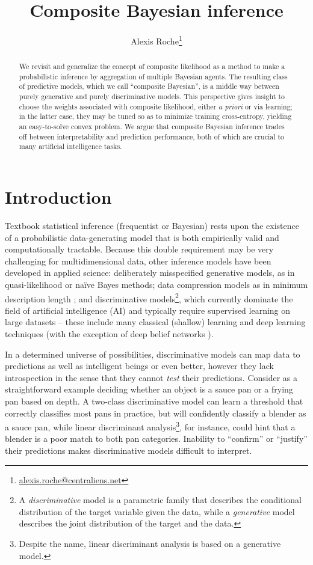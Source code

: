 \documentclass[english]{scrartcl}
\title{Composite Bayesian inference}
\author{Alexis Roche\thanks{\url{alexis.roche@centraliens.net}}}
\begin{document}
\maketitle

\begin{abstract}
We revisit and generalize the concept of composite likelihood as a method to make a probabilistic inference by aggregation of multiple Bayesian agents. The resulting class of predictive models, which we call ``composite Bayesian'', is a middle way between purely generative and purely discriminative models. This perspective gives insight to choose the weights associated with composite likelihood, either {\em a priori} or via learning; in the latter case, they may be tuned so as to minimize training cross-entropy, yielding an easy-to-solve convex problem. We argue that composite Bayesian inference trades off between interpretability and prediction performance, both of which are crucial to many artificial intelligence tasks.
\end{abstract}


\section{Introduction}
\label{sec:intro}

Textbook statistical inference (frequentist or Bayesian) rests upon the existence of a probabilistic data-generating model that is both empirically valid and computationally tractable. Because this double requirement may be very challenging for multidimensional data, other inference models have been developed in applied science: deliberately misspecified generative models, as in quasi-likelihood \cite{White-82,Walker-13} or na\"ive Bayes \cite{Ng-01} methods; data compression models as in minimum description length \cite{Grunwald-07}; and discriminative models\footnote{A {\em discriminative} model is a parametric family that describes the conditional distribution of the target variable given the data, while a {\em generative} model describes the joint distribution of the target and the data.}, which currently dominate the field of artificial intelligence (AI) and typically require supervised learning on large datasets -- these include many classical (shallow) learning \cite{Ho-95,BergerA-96,Vapnik-00,Rasmussen-06} and deep learning \cite{Lecun-15,Goodfellow-16} techniques (with the exception of deep belief networks \cite{Hinton-06}).

In a determined universe of possibilities, discriminative models can map data to predictions as well as intelligent beings or even better, however they lack introspection in the sense that they cannot {\em test} their predictions. Consider as a straightforward example deciding whether an object is a sauce pan or a frying pan based on depth. A two-class discriminative model can learn a threshold that correctly classifies most pans in practice, but will confidently classify a blender as a sauce pan, while linear discriminant analysis\footnote{Despite the name, linear discriminant analysis is based on a generative model.}, for instance, could hint that a blender is a poor match to both pan categories. Inability to ``confirm'' or ``justify'' their predictions makes discriminative models difficult to interpret.
\end{document}
